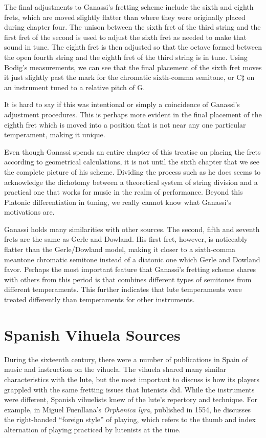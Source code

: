The final adjustments to Ganassi's fretting scheme include the sixth and eighth frets,
which are moved slightly flatter than where they were originally placed during chapter
four. The unison between the sixth fret of the third string and the first fret of the
second is used to adjust the sixth fret as needed to make that sound in tune.  The
eighth fret is then adjusted so that the octave formed between the open fourth string
and the eighth fret of the third string is in tune.  Using Bodig's measurements, we can
see that the final placement of the sixth fret moves it just slightly past the mark for
the chromatic sixth-comma semitone, or C$\sharp$ on an instrument tuned to a relative
pitch of G.

It is hard to say if this was intentional or simply a coincidence of Ganassi's
adjustment procedures.  This is perhaps more evident in the final placement of the
eighth fret which is moved into a position that is not near any one particular
temperament, making it unique.


Even though Ganassi spends an entire chapter of this treatise on placing the frets
according to geometrical calculations, it is not until the sixth chapter that we see
the complete picture of his scheme.  Dividing the process such as he does seems to
acknowledge the dichotomy between a theoretical system of string division and a
practical one that works for music in the realm of performance.  Beyond this Platonic
differentiation in tuning, we really cannot know what Ganassi's motivations are.

Ganassi holds many similarities with other sources.  The second, fifth and seventh
frets are the same as Gerle and Dowland.  His first fret, however, is noticeably
flatter than the Gerle/Dowland model, making it closer to a sixth-comma meantone
chromatic semitone instead of a diatonic one which Gerle and Dowland favor. Perhaps the
most important feature that Ganassi's fretting scheme shares with others from this
period is that combines different types of semitones from different temperaments.  This
further indicates that lute temperaments were treated differently than temperaments for
other instruments.

\section{Spanish Vihuela Sources}

During the sixteenth century, there were a number of publications in  Spain of music
and instruction on the vihuela.  The vihuela shared many similar characteristics with
the lute, but the most important to discuss is how its players grappled with the same
fretting issues that lutenists did. While the instruments were different, Spanish
vihuelists knew of the lute's repertory and technique.  For example, in Miguel
Fuenllana's \textit{Orphenica lyra}, published in 1554, he discusses the right-handed
``foreign style'' of playing, which refers to the thumb and index alternation of
playing practiced by lutenists at the time.

